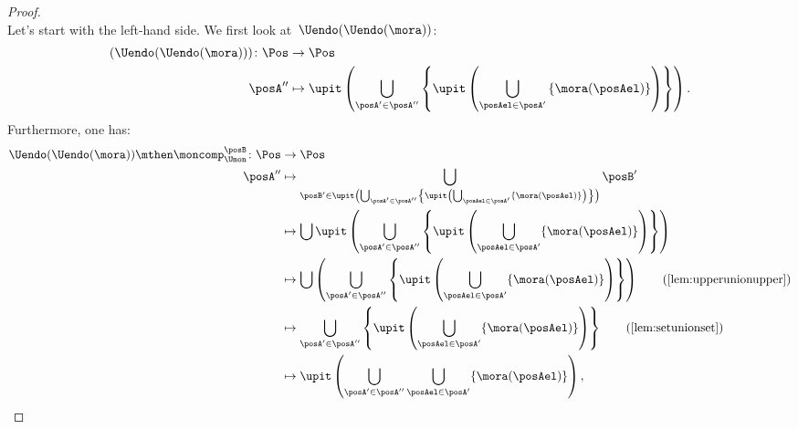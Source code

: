 \begin{proof}
\begin{equation}
    \end{equation}
    Let's start with the left-hand side.
    We first look at~$\Uendo(\Uendo(\mora))$:
    \begin{equation}
        \begin{aligned}
            (\Uendo(\Uendo(\mora)))
            \colon \Pos & \to \Pos                                                                                                                                                  \\
            \posA''     & \mapsto \upit \left( \bigcup_{\posA' \in \posA''}\left \{ \upit \left( \bigcup_{\posAel \in \posA'} \left\{ \mora(\posAel)\right\}\right)\right\}\right).
        \end{aligned}
    \end{equation}
    Furthermore, one has:
    \begin{equation}
        \begin{aligned}
            \Uendo(\Uendo(\mora))\mthen \moncomp_{\Umon}^{\posB}\colon \Pos & \to \Pos                                                                                                                                                                                         \\
            \posA''                                                         & \mapsto \bigcup_{\posB'\in \upit \left( \bigcup_{\posA'\in \posA''} \left\{ \upit \left( \bigcup_{\posAel \in \posA'} \{ \mora(\posAel)\}\right)\right\} \right)} \posB'                         \\
                                                                            & \mapsto \bigcup \upit \left( \bigcup_{\posA'\in \posA''} \left\{ \upit \left( \bigcup_{\posAel \in \posA'} \{ \mora(\posAel)\}\right)\right\} \right)                                            \\
                                                                            & \mapsto \bigcup  \left( \bigcup_{\posA'\in \posA''} \left\{ \upit \left( \bigcup_{\posAel \in \posA'} \{ \mora(\posAel)\}\right)\right\} \right) \quad \quad (\text{\cref{lem:upperunionupper}}) \\
                                                                            & \mapsto   \bigcup_{\posA'\in \posA''} \left\{ \upit \left( \bigcup_{\posAel \in \posA'} \{ \mora(\posAel)\}\right)\right\} \quad \quad (\text{\cref{lem:setunionset}})                           \\
                                                                            & \mapsto   \upit \left(\bigcup_{\posA'\in \posA''}  \bigcup_{\posAel \in \posA'} \{ \mora(\posAel)\}\right),

\end{aligned}
\end{equation}
\end{proof}
